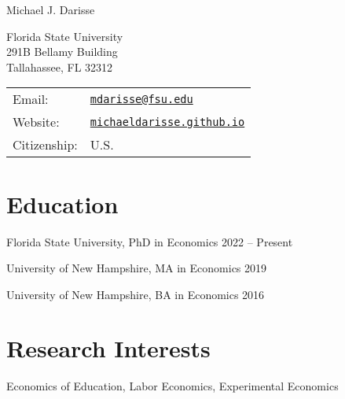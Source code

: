 \documentclass[letterpaper]{article}
\def\name{Michael J. Darisse}
\renewenvironment{itemize}{
  \begin{list}{}{
    \setlength{\leftmargin}{1.5em}
  }
}{
  \end{list}
}
\begin{document}
{\huge \name}


\vspace{0.25in}

\begin{minipage}{0.45\linewidth}
  Florida State University \\
  291B Bellamy Building \\
  Tallahassee, FL 32312 \\
\end{minipage}
\begin{minipage}{0.45\linewidth}
  \begin{tabular}{ll}
    Email: & \href{mailto:mdarisse@fsu.edu}{\tt mdarisse@fsu.edu} \\
    Website: & \href{http://michaeldarisse.github.io/}{\tt michaeldarisse.github.io} \\
    Citizenship: & U.S. \\
  \end{tabular}
\end{minipage}


\section*{Education}

\begin{itemize}
  \item Florida State University, PhD in Economics  \hfill 2022 -- Present 
  \item University of New Hampshire, MA in Economics \hfill 2019 
  \item University of New Hampshire, BA in Economics  \hfill 2016 
\end{itemize}



\section*{Research Interests}

\begin{itemize}
    \item Economics of Education, Labor Economics, Experimental Economics
\end{itemize}
\end{document}
